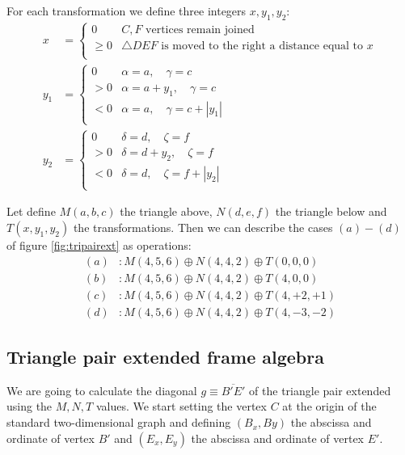 \documentclass[11pt]{article}
\begin{document}
For each transformation we define three integers $x, y_1, y_2$:
\begin{align}
x &= \left \{ \begin{array}{rl}
 0       &  C,F \mbox{ vertices remain joined}\\
 \geq  0 &  \triangle{DEF} \mbox{ is moved to the right a distance equal to } x \\
 \end{array}\right. \\
y_1 &= \left \{ \begin{array}{rl}
 0   & \alpha = a,\quad \gamma = c \\
 > 0 & \alpha = a + y_1,\quad \gamma = c \\
 < 0 & \alpha = a,\quad \gamma = c + |y_1| \\
 \end{array}\right. \\ 
y_2 &= \left \{ \begin{array}{rl}
 0   & \delta = d,\quad \zeta = f \\
 > 0 & \delta = d + y_2,\quad \zeta = f \\
 < 0 & \delta = d,\quad \zeta = f + |y_2| \\
 \end{array}\right. 
\end{align}

Let define $M(a,b,c)$ the triangle above, $N(d,e,f)$ the triangle below and $T(x,y_1,y_2)$ the transformations.
Then we can describe the cases $(a)-(d)$ of figure \ref{fig:tripairext} as operations:
\begin{align*}
(a) &: M(4,5,6) \oplus N(4,4,2) \oplus T(0,0,0) \\
(b) &: M(4,5,6) \oplus N(4,4,2) \oplus T(4,0,0) \\
(c) &: M(4,5,6) \oplus N(4,4,2) \oplus T(4,+2,+1) \\
(d) &: M(4,5,6) \oplus N(4,4,2) \oplus T(4,-3,-2)
\end{align*}

\subsection{Triangle pair extended frame algebra}

We are going to calculate the diagonal $g \equiv \overline{B'E'}$ of the triangle pair extended using the $M,N,T$ values. We start setting the vertex $C$ at the origin of the standard two-dimensional graph and defining $(B_x, By)$ the abscissa and ordinate of vertex $B'$ and
$(E_x, E_y)$ the abscissa and ordinate of vertex $E'$.
\end{document}
